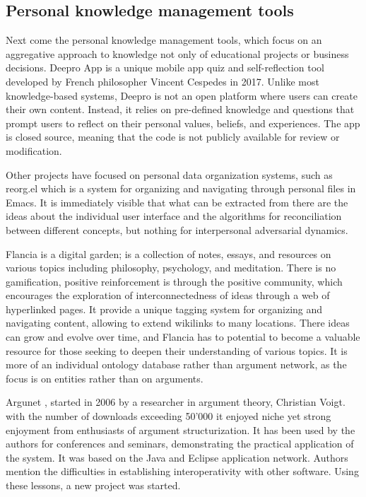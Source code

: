\documentclass{report}
\begin{document}
\subsection{Personal knowledge management tools}
Next come the personal knowledge management tools, which focus on an aggregative approach to knowledge not only of educational projects or business decisions.
Deepro App \cite{noauthor_deepro_nodate} is a unique mobile app quiz and self-reflection tool developed by French philosopher Vincent Cespedes \cite{noauthor_vincent_2023} in 2017. Unlike most knowledge-based systems, Deepro is not an open platform where users can create their own content. Instead, it relies on pre-defined knowledge and questions that prompt users to reflect on their personal values, beliefs, and experiences. The app is closed source, meaning that the code is not publicly available for review or modification.

Other projects have focused on personal data organization systems, such as reorg.el \cite{noauthor_reorg_2023} which is a system for organizing and navigating through personal files in Emacs. It is immediately visible that what can be extracted from there are the ideas about the individual user interface and the algorithms for reconciliation between different concepts, but nothing for interpersonal adversarial dynamics.

Flancia \cite{flancian_welcome_2019} is a digital garden; is a collection of notes, essays, and resources on various topics including philosophy, psychology, and meditation. There is no gamification, positive reinforcement is through the positive community, which encourages the exploration of interconnectedness of ideas through a web of hyperlinked pages. It provide a unique tagging system for organizing and navigating content, allowing to extend wikilinks to many locations. There ideas can grow and evolve over time, and Flancia has to potential to become a valuable resource for those seeking to deepen their understanding of various topics. It is more of an individual ontology database rather than argument network, as the focus is on entities rather than on arguments.

Argunet \cite{noauthor_argunet_2018}, started in 2006 by a researcher in argument theory, Christian Voigt. with the number of downloads exceeding 50'000 it enjoyed niche yet strong enjoyment from enthusiasts of argument structurization. It has been used by the authors for conferences and seminars, demonstrating the practical application of the system. It was based on the Java and Eclipse application network. Authors mention the difficulties in establishing interoperativity with other software. Using these lessons, a new project was started.
\end{document}

